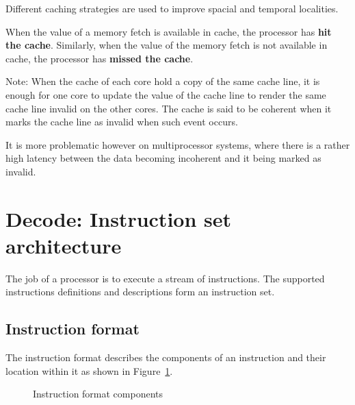 \documentclass{report}
\begin{document}
Different caching strategies are used to improve spacial and temporal
localities.

When the value of a memory fetch is available in cache, the processor has
\textbf{hit the cache}. Similarly, when the value of the memory fetch is not
available in cache, the processor has \textbf{missed the cache}.

Note: When the cache of each core hold a copy of the same cache line, it is
enough for one core to update the value of the cache line to render the same
cache line invalid on the other cores. The cache is said to be coherent when it
marks the cache line as invalid when such event occurs.

It is more problematic however on multiprocessor systems, where there is a
rather high latency between the data becoming incoherent and it being marked as
invalid.



\section{Decode: Instruction set architecture}

The job of a processor is to execute a stream of instructions. The supported
instructions definitions and descriptions form an instruction set.



\subsection{Instruction format}

The instruction format describes the components of an instruction and their
location within it as shown in Figure~\ref{fig:instruction-format-components}.

\begin{figure}[H]
\centering
{}
\caption{Instruction format components}\label{fig:instruction-format-components}
\end{figure}
\end{document}
